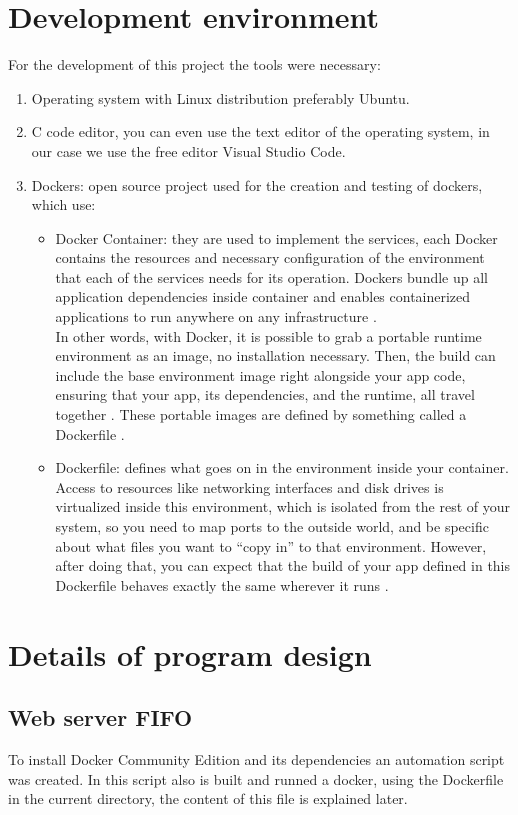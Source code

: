 \documentclass{article}
\begin{document}
\section{Development environment}
For the development of this project the tools were necessary:
\begin{enumerate}
    \item Operating system with Linux distribution preferably Ubuntu.
    \item C code editor, you can even use the text editor of the operating system, in our case we use the free editor Visual Studio Code.
    \item Dockers: open source project used for the creation and testing of dockers, which use:
    \begin{itemize}
        \item Docker Container: they are used to implement the services, each Docker contains the resources and necessary configuration of the environment that each of the services needs for its operation. Dockers bundle up all application dependencies inside container and enables containerized applications to run anywhere on any infrastructure \cite{DockerEngine}.\\
        In other words, with Docker, it is possible to grab a portable runtime environment as an image, no installation necessary. Then, the build can include the base environment image right alongside your app code, ensuring that your app, its dependencies, and the runtime, all travel together \cite{DockerContainer}.
        These portable images are defined by something called a Dockerfile \cite{DockerContainer}.
        \item Dockerfile: defines what goes on in the environment inside your container. Access to resources like networking interfaces and disk drives is virtualized inside this environment, which is isolated from the rest of your system, so you need to map ports to the outside world, and be specific about what files you want to “copy in” to that environment. However, after doing that, you can expect that the build of your app defined in this Dockerfile behaves exactly the same wherever it runs \cite{DockerContainer}.
    \end{itemize}
\end{enumerate}

\section{Details of program design}
\subsection{Web server FIFO}
To install Docker Community Edition and its dependencies an automation script was created. In this script also is built and runned a docker, using the Dockerfile in the current directory, the content of this file is explained later.
\end{document}
